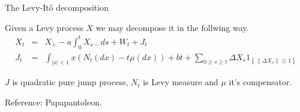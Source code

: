 

\begin{frame}
    {The Levy-It\^o decomposition}
    
    Given a Levy process $X$ we may decompose it in the follwing way.
    \begin{eqnarray*}
        X_t &=&  X_+ - a \int_{0}^{t} X_{s-} ds + W_t + J_t \\
        J_t &=& \int_{ |x| <1} x\left( N_t (dx) - t \mu(dx) \right) + bt +
        \sum_{0 \geq s \geq t} 
        \Delta X_s 1_{  \left\{ \left\| \Delta X_s \right\| \geq 1 \right\} }
    \end{eqnarray*}

    $J$ is quadratic pure jump process, $N_t$ is Levy measure and $\mu$ it's compensator. 

    Reference: Papapantoleon.
\end{frame}








